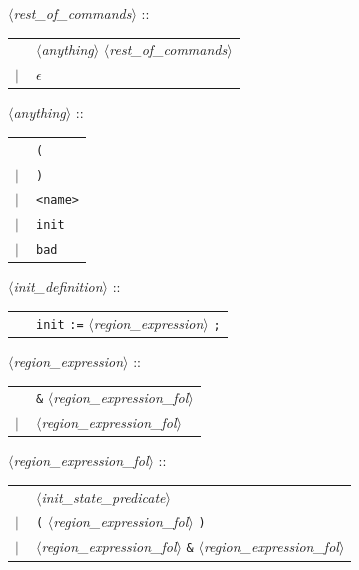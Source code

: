\documentclass[a4paper,11pt]{report}
\newcommand{\emptystring}{$\epsilon$}
\newcommand{\nt}[1]{$\langle$\emph{#1}$\rangle$}
\newcommand{\regleGrammaire}[1]{\bigskip \noindent \nt{#1} :: \\}
\newcommand{\npec}[1]{\textcolor{green!50!black}{#1}}
\newcommand{\styleIMI}[1]{\textcolor{imicolor}{\texttt{#1}}}
\begin{document}
\regleGrammaire{\npec{rest\_of\_commands}}
\begin{tabular}{l l}
	\  & \npec{\nt{anything}} \npec{\nt{rest\_of\_commands}} \\
	$|$ & \emptystring \\
\end{tabular}

\regleGrammaire{\npec{anything}}
\begin{tabular}{l l}
	\  & \styleIMI{(} \\
	$|$ & \styleIMI{)} \\
	$|$ & \styleIMI{<name>} \\
	$|$ & \styleIMI{init} \\
	$|$ & \styleIMI{bad} \\
\end{tabular}


\regleGrammaire{init\_definition}
\begin{tabular}{l l}
	\  & \styleIMI{init} \styleIMI{:=} \nt{region\_expression} \styleIMI{;} \\
\end{tabular}

\regleGrammaire{region\_expression}
\begin{tabular}{l l}
	\  & \styleIMI{\&} \nt{region\_expression\_fol}\\
	$|$ & \nt{region\_expression\_fol}\\
\end{tabular}

\regleGrammaire{region\_expression\_fol}
\begin{tabular}{l l}
	\  & \nt{init\_state\_predicate} \\
	$|$ & \styleIMI{(} \nt{region\_expression\_fol} \styleIMI{)} \\
	$|$ & \nt{region\_expression\_fol} \styleIMI{\&} \nt{region\_expression\_fol} \\
\end{tabular}
\end{document}
